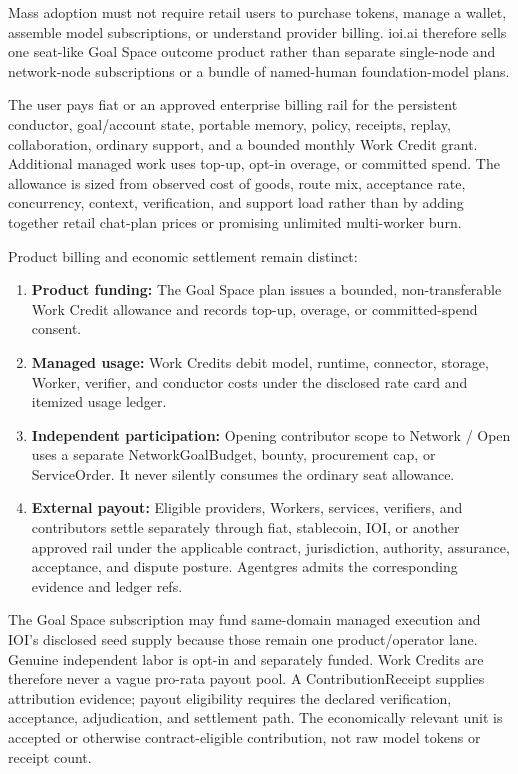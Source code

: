 \documentclass[
  11pt,
]{article}
\providecommand{\tightlist}{%
  \setlength{\itemsep}{0pt}\setlength{\parskip}{0pt}}
\begin{document}
Mass adoption must not require retail users to purchase tokens, manage a
wallet, assemble model subscriptions, or understand provider billing.
ioi.ai therefore sells one seat-like Goal Space outcome product rather
than separate single-node and network-node subscriptions or a bundle of
named-human foundation-model plans.

The user pays fiat or an approved enterprise billing rail for the
persistent conductor, goal/account state, portable memory, policy,
receipts, replay, collaboration, ordinary support, and a bounded monthly
Work Credit grant. Additional managed work uses top-up, opt-in overage,
or committed spend. The allowance is sized from observed cost of goods,
route mix, acceptance rate, concurrency, context, verification, and
support load rather than by adding together retail chat-plan prices or
promising unlimited multi-worker burn.

Product billing and economic settlement remain distinct:

\begin{enumerate}
\def\labelenumi{\arabic{enumi}.}
\tightlist
\item
  \textbf{Product funding:} The Goal Space plan issues a bounded,
  non-transferable Work Credit allowance and records top-up, overage, or
  committed-spend consent.
\item
  \textbf{Managed usage:} Work Credits debit model, runtime, connector,
  storage, Worker, verifier, and conductor costs under the disclosed rate
  card and itemized usage ledger.
\item
  \textbf{Independent participation:} Opening contributor scope to
  Network / Open uses a separate NetworkGoalBudget, bounty, procurement
  cap, or ServiceOrder. It never silently consumes the ordinary seat
  allowance.
\item
  \textbf{External payout:} Eligible providers, Workers, services,
  verifiers, and contributors settle separately through fiat, stablecoin,
  IOI, or another approved rail under the applicable contract,
  jurisdiction, authority, assurance, acceptance, and dispute posture.
  Agentgres admits the corresponding evidence and ledger refs.
\end{enumerate}

The Goal Space subscription may fund same-domain managed execution and
IOI's disclosed seed supply because those remain one product/operator
lane. Genuine independent labor is opt-in and separately funded. Work
Credits are therefore never a vague pro-rata payout pool. A
ContributionReceipt supplies attribution evidence; payout eligibility
requires the declared verification, acceptance, adjudication, and
settlement path. The economically relevant unit is accepted or otherwise
contract-eligible contribution, not raw model tokens or receipt count.
\end{document}
